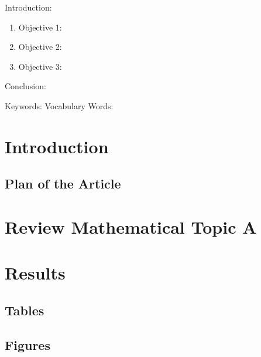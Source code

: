 

\twocolumn
\scriptsize
\begin{frontmatter}
		\title{}
		\author{}
		\address{The Mathematical Learning Space}
\end{frontmatter}	

Introduction:
\begin{enumerate}
\item Objective 1:
\item Objective 2:
\item Objective 3:
\end{enumerate}
Conclusion:

Keywords: 
Vocabulary Words:

\section{Introduction}

\subsection{Plan of the Article}


\section{Review Mathematical Topic A}


\section{Results}

\subsection{Tables}

\subsection{Figures}

